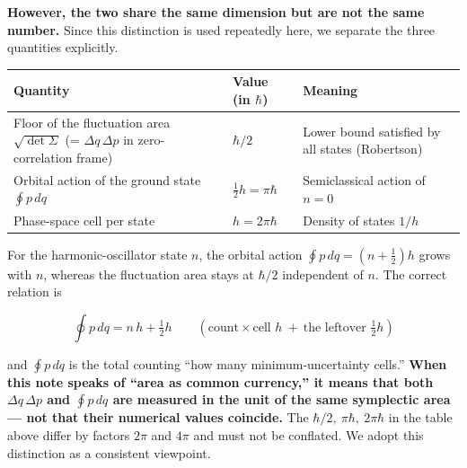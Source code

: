 \documentclass[
]{article}
\newcounter{none} %
\begin{document}
\textbf{However, the two share the same dimension but are not the same
number.} Since this distinction is used repeatedly here, we separate the
three quantities explicitly.

{\def\LTcaptype{none} %
\begin{longtable}[]{@{}
  >{\raggedright\arraybackslash}p{}
  >{\raggedright\arraybackslash}p{}
  >{\raggedright\arraybackslash}p{}@{}}
\toprule\noalign{}
\begin{minipage}[b]{\linewidth}\raggedright
Quantity
\end{minipage} & \begin{minipage}[b]{\linewidth}\raggedright
Value (in \(\hbar\))
\end{minipage} & \begin{minipage}[b]{\linewidth}\raggedright
Meaning
\end{minipage} \\
\midrule\noalign{}
\endhead
\bottomrule\noalign{}
\endlastfoot
Floor of the fluctuation area \(\sqrt{\det\Sigma}\) (=
\(\Delta q\,\Delta p\) in zero-correlation frame) & \(\hbar/2\) & Lower
bound satisfied by all states (Robertson) \\
Orbital action of the ground state \(\oint p\,dq\) &
\(\tfrac12 h=\pi\hbar\) & Semiclassical action of \(n=0\) \\
Phase-space cell per state & \(h=2\pi\hbar\) & Density of states
\(1/h\) \\
\end{longtable}
}

For the harmonic-oscillator state \(n\), the orbital action
\(\oint p\,dq=(n+\tfrac12)h\) grows with \(n\), whereas the fluctuation
area stays at \(\hbar/2\) independent of \(n\). The correct relation is

\[\oint p\,dq = n\,h + \tfrac12 h\qquad(\text{count}\times\text{cell }h\ +\ \text{the leftover }\tfrac12 h)\]

and \(\oint p\,dq\) is the total counting ``how many minimum-uncertainty
cells.'' \textbf{When this note speaks of ``area as common currency,''
it means that both \(\Delta q\,\Delta p\) and \(\oint p\,dq\) are
measured in the unit of the same symplectic area --- not that their
numerical values coincide.} The \(\hbar/2,\ \pi\hbar,\ 2\pi\hbar\) in
the table above differ by factors \(2\pi\) and \(4\pi\) and must not be
conflated. We adopt this distinction as a consistent viewpoint.
\end{document}
